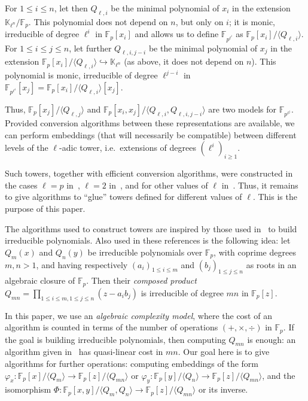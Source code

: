 \documentclass{sig-alternate}
\def\F {\ensuremath{\mathbb{F}}}
\def\K {\ensuremath{\mathbb{K}}}
\newcounter{algo}
\newcommand{\ang}[1]{\langle#1\rangle}
\begin{document}
For $1 \le i \le n$, let then $Q_{\ell,i}$ be the minimal polynomial
of $x_i$ in the extension $\K_{\ell^n}/\F_p$. This polynomial does
not depend on $n$, but only on $i$; it is monic, irreducible of degree
$\ell^i$ in $\F_p[x_i]$ and allows us to define $\F_{p^{\ell^i}}$ as
$\F_p[x_i]/\ang{Q_{\ell,i}}$.
For $1 \le i \le j \le n$, let further $Q_{\ell,i,j-i}$ be the minimal
polynomial of $x_j$ in the extension $\F_p[x_i]/\ang{Q_{\ell,i}} \hookrightarrow
\K_{\ell^n}$ (as above, it does not depend on $n$). This polynomial is
monic, irreducible of degree $\ell^{j-i}$ in
$\F_{p^{\ell^i}}[x_j]=\F_p[x_i]/\ang{Q_{\ell,i}}[x_j]$.

Thus, $\F_p[x_j]/\ang{Q_{\ell,j}}$ and
$\F_p[x_i,x_j]/\ang{Q_{\ell,i},Q_{\ell,i,j-i}}$ are two models for
$\F_{p^{\ell^j}}$. Provided conversion algorithms between these
representations are available, we can perform embeddings (that will
necessarily be compatible) between different levels of the $\ell$-adic
tower, i.e.\ extensions of degrees $(\ell^i)_{i \ge 1}$.

Such towers, together with efficient conversion algorithms, were
constructed in the cases $\ell = p$
in~\cite{cantor89,couveignes00,df+schost12}, $\ell=2$
in~\cite{DoSc12}, and for other values of $\ell$ in~\cite{DeDoSc13}.
Thus, it remains to give algorithms to ``glue'' towers defined for
different values of $\ell$. This is the purpose of this paper.

\smallskip{} The algorithms used
to construct towers are inspired by those used
in~\cite{Shoup90,shoup94,couveignes+lercier11} to build irreducible
polynomials. Also used in these references is the following idea: let
$Q_m(x)$ and $Q_n(y)$ be irreducible polynomials over $\F_p$, with
coprime degrees $m,n>1$, and having respectively $(a_i)_{1 \le i
  \le m}$ and $(b_j)_{1 \le j \le n}$ as roots in an algebraic closure
of $\F_p$. Then their {\em composed product} $Q_{mn} = \prod_{1 \le i
  \le m, 1 \le j \le n} (z- a_i b_j)$ is irreducible of degree $mn$ in
$\F_p[z]$.

In this paper, we use an {\em algebraic complexity model}, where the
cost of an algorithm is counted in terms of the number of operations
$(+,\times,\div)$ in $\F_p$.  If the goal is building irreducible
polynomials, then computing $Q_{mn}$ is enough: an algorithm given
in~\cite{BoFlSaSc06} has quasi-linear cost in $mn$. Our goal here is
to give algorithms for further operations: computing embeddings of the
form $\varphi_x: \F_p[x]/\ang{Q_m}\to \F_p[z]/\ang{Q_{mn}}$ or
$\varphi_y: \F_p[y]/\ang{Q_n}\to \F_p[z]/\ang{Q_{mn}}$, and the
isomorphism $\Phi: \F_p[x,y]/\ang{Q_m,Q_n}\to \F_p[z]/\ang{Q_{mn}}$ or
its inverse.
\end{document}
